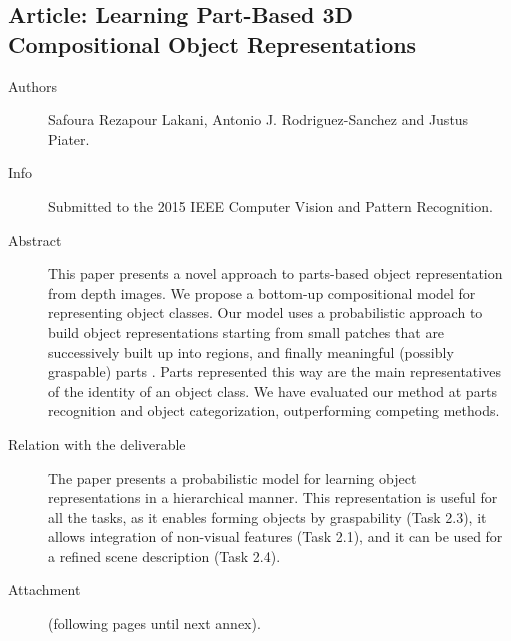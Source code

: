 \documentclass[a4paper,11pt,pdf]{pacmanreport}
\begin{document}
\subsection{Article: Learning Part-Based 3D Compositional Object Representations} \label{ann:cvpr} 
\begin{description}
	\item[Authors] Safoura Rezapour Lakani, Antonio J. Rodriguez-Sanchez and Justus Piater.
	\item[Info] Submitted to the 2015 IEEE Computer Vision and Pattern Recognition.
	\item[Abstract] This paper presents a novel approach to parts-based object representation from depth images. We propose a bottom-up compositional model for representing object classes. Our model uses a probabilistic approach to build object representations starting from small patches that are successively built up into regions, and finally meaningful (possibly graspable) parts . Parts represented this way are the main representatives of the identity of an object class. We have evaluated our method at parts recognition and object categorization, outperforming competing methods.
	\item[Relation with the deliverable] The paper presents a probabilistic model for learning object representations in a hierarchical manner. This representation is useful for all the tasks, as it enables forming objects by graspability (Task 2.3), it allows integration of non-visual features (Task 2.1), and it can be used for a refined scene description (Task 2.4).
    \item[Attachment] (following pages until next annex).
\end{description}

\end{document}
